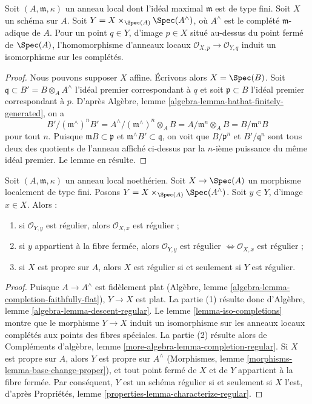 \begin{lemma} \label{lemma-iso-completions} Soit $(A, \mathfrak m, \kappa)$ un anneau local dont l'idéal maximal $\mathfrak m$ est de type fini. Soit $X$ un schéma sur $A$. Soit $Y = X \times_{\Spec(A)} \Spec(A^\wedge)$, où $A^\wedge$ est le complété $\mathfrak m$-adique de $A$. Pour un point $q \in Y$, d'image $p \in X$ situé au-dessus du point fermé de $\Spec(A)$, l'homomorphisme d'anneaux locaux $\mathcal{O}_{X, p} \to \mathcal{O}_{Y, q}$ induit un isomorphisme sur les complétés. \end{lemma}

\begin{proof} Nous pouvons supposer $X$ affine. Écrivons alors $X = \Spec(B)$. Soit $\mathfrak q \subset B' = B \otimes_A A^\wedge$ l'idéal premier correspondant à $q$ et soit $\mathfrak p \subset B$ l'idéal premier correspondant à $p$. D'après Algèbre, lemme \ref{algebra-lemma-hathat-finitely-generated}, on a $$
B'/(\mathfrak m^\wedge)^n B' =
A^\wedge/(\mathfrak m^\wedge)^n \otimes_A B =
A/\mathfrak m^n \otimes_A B = B/\mathfrak m^n B
$$ pour tout $n$. Puisque $\mathfrak m B \subset \mathfrak p$ et $\mathfrak m^\wedge B' \subset \mathfrak q$, on voit que $B/\mathfrak p^n$ et $B'/\mathfrak q^n$ sont tous deux des quotients de l'anneau affiché ci-dessus par la $n$-ième puissance du même idéal premier. Le lemme en résulte. \end{proof}

\begin{lemma} \label{lemma-port-regularity-to-completion} Soit $(A, \mathfrak m, \kappa)$ un anneau local noethérien. Soit $X \to \Spec(A)$ un morphisme localement de type fini. Posons $Y = X \times_{\Spec(A)} \Spec(A^\wedge)$. Soit $y \in Y$, d'image $x \in X$. Alors : \begin{enumerate} \item si $\mathcal{O}_{Y, y}$ est régulier, alors $\mathcal{O}_{X, x}$ est régulier ; \item si $y$ appartient à la fibre fermée, alors $\mathcal{O}_{Y, y}$ est régulier $\Leftrightarrow \mathcal{O}_{X, x}$ est régulier ; \item si $X$ est propre sur $A$, alors $X$ est régulier si et seulement si $Y$ est régulier. \end{enumerate} \end{lemma}

\begin{proof} Puisque $A \to A^\wedge$ est fidèlement plat (Algèbre, lemme \ref{algebra-lemma-completion-faithfully-flat}), $Y \to X$ est plat. La partie (1) résulte donc d'Algèbre, lemme \ref{algebra-lemma-descent-regular}. Le lemme \ref{lemma-iso-completions} montre que le morphisme $Y \to X$ induit un isomorphisme sur les anneaux locaux complétés aux points des fibres spéciales. La partie (2) résulte alors de Compléments d'algèbre, lemme \ref{more-algebra-lemma-completion-regular}. Si $X$ est propre sur $A$, alors $Y$ est propre sur $A^\wedge$ (Morphismes, lemme \ref{morphisms-lemma-base-change-proper}), et tout point fermé de $X$ et de $Y$ appartient à la fibre fermée. Par conséquent, $Y$ est un schéma régulier si et seulement si $X$ l'est, d'après Propriétés, lemme \ref{properties-lemma-characterize-regular}. \end{proof}

